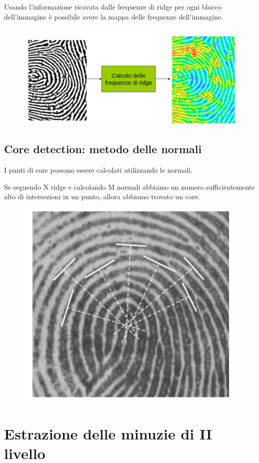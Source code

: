 Usando l’informazione ricavata dalle frequenze di
ridge per ogni blocco dell’immagine è possibile
avere la mappa delle frequenze dell’immagine.

\begin{figure}[ht]
    \centering
    \includegraphics[width=1\linewidth]{chapters/images-chap6/spazio-freq.png}
\end{figure}

\subsection{Core detection: metodo delle normali}

I punti di core possono essere calcolati utilizzando le normali.

Se seguendo N ridge e calcolando M normali abbiamo un numero sufficientemente
alto di intersezioni in un punto, allora abbiamo trovato un core.

\begin{figure}[ht]
    \centering
    \includegraphics[width=0.5\linewidth]{chapters/images-chap6/core-detection.png}
\end{figure}

\section{Estrazione delle minuzie di II livello}

